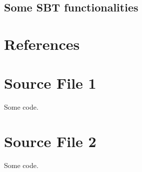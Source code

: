 \documentclass{article}
\begin{document}
\subsection{Some SBT functionalities}
\section{References}



\listoffigures
\listoftables

\begin{appendices}

\section{Source File 1}

Some code.

\section{Source File 2}

Some code.
\end{appendices}  
\end{document}
